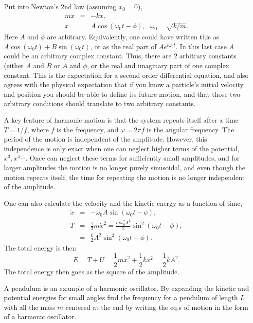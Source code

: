 Put into Newton's 2nd law (assuming $x_0=0$),
\begin{eqnarray}
m\ddot{x}&=&-kx,\\
x&=&A\cos(\omega_0 t-\phi),~~~\omega_0=\sqrt{k/m}.
\end{eqnarray}
Here $A$ and $\phi$ are arbitrary. Equivalently, one could have written this as $A\cos(\omega_0 t)+B\sin(\omega_0 t)$, or as the real part of $Ae^{i\omega_0 t}$. In this last case $A$ could be an arbitrary complex constant. Thus, there are 2 arbitrary constants (either $A$ and $B$ or $A$ and $\phi$, or the real and imaginary part of one complex constant. This is the expectation for a second order differential equation, and also agrees with the physical expectation that if you know a particle's initial velocity and position you should be able to define its future motion, and that those two arbitrary conditions should translate to two arbitrary constants.

A key feature of harmonic motion is that the system repeats itself after a time $T=1/f$, where $f$ is the frequency, and $\omega=2\pi f$ is the angular frequency. The period of the motion is independent of the amplitude. However, this independence is only exact when one can neglect higher terms of the potential, $x^3, x^4\cdots$. Once can neglect these terms for sufficiently small amplitudes, and for larger amplitudes the motion is no longer purely sinusoidal, and even though the motion repeats itself, the time for repeating the motion is no longer independent of the amplitude.

One can also calculate the velocity and the kinetic energy as a function of time,
\begin{eqnarray}
\dot{x}&=&-\omega_0A\sin(\omega_0 t-\phi),\\
\nonumber
T&=&\frac{1}{2}m\dot{x}^2=\frac{m\omega_0^2A^2}{2}\sin^2(\omega_0t-\phi),\\
\nonumber
&=&\frac{k}{2}A^2\sin^2(\omega_0t-\phi).
\end{eqnarray}
The total energy is then
\begin{equation}
E=T+U=\frac{1}{2}m\dot{x}^2+\frac{1}{2}kx^2=\frac{1}{2}kA^2.
\end{equation}
The total energy then goes as the square of the amplitude.

\example
A pendulum is an example of a harmonic oscillator. By expanding the kinetic and potential energies for small angles find the frequency for a pendulum of length $L$ with all the mass $m$ centered at the end by writing the eq.s of motion in the form of a harmonic oscillator.

